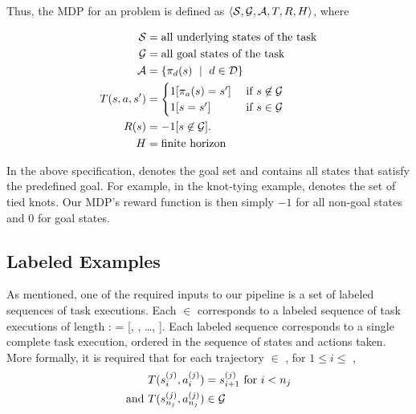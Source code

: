 Thus, the MDP for an \mmql{} problem is defined as
$\langle\mathcal{S},\mathcal{G},\mathcal{A},T,R,H\rangle$, where

\begin{equation}
\begin{aligned}
\stateset{} &=  \text{all underlying states of the task} \\
\goalset{} &=  \text{all goal states of the task} \\
\actionset{} &= \{\policysub{\demovar{}}{\statevar{}}\ \mid \text{ } \demovar{} \in \demoset{}\} \\
\transitionfn{}(\statevar{}, \actionvar{}, \nextstatevar{}) &=
    \begin{cases}
    1[\policysub{\actionvar{}}{\statevar{}} = \nextstatevar{}] &\text{ if } \statevar{} \not \in \goalset{} \\
    1[\statevar{} = \statevar{}'] &\text{ if } \statevar{} \in \goalset{}
    \end{cases}\\
\rewardfn{}(\statevar{}) &= -1 {[ \statevar{} \not \in \goalset{} ]}. \\
H &= \text{finite horizon}
\end{aligned}
\label{eq:mdp}
\end{equation}

In the above specification, \goalset{} denotes the goal set and contains all
states that satisfy the predefined goal. For example, in the knot-tying example,
\goalset{} denotes the set of tied knots.  Our MDP's reward function is then
simply $-1$ for all non-goal states and $0$ for goal states.

\subsection{Labeled Examples}
\label{subsec:labeledex}

As mentioned, one of the required inputs to our pipeline is a set 
of labeled sequences of task executions. Each  $\in$ 
corresponds to a labeled sequence of
task executions of length :  = [,
, \ldots, ]. Each labeled sequence corresponds
to a single complete task execution, ordered in the sequence of states and
actions taken. More formally, it is required that for each trajectory
 $\in$ , for $1 \leq i \leq$ ,
\begin{align*}
T(s_{i}^{(j)}, a_{i}^{(j)}) &= s_{i+1}^{(j)} \text{ for } i < n_{j} \\
\text{and } T(s_{n_{j}}^{(j)}, a_{n_{j}}^{(j)}) &\in \mathcal{G}{}
\end{align*}

